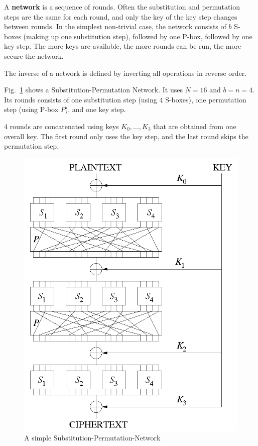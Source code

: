 A \textbf{network} is a sequence of rounds.
Often the substitution and permutation steps are the same for each round, and only the key of the key step changes between rounds.
In the simplest non-trivial case, the network consists of $b$ S-boxes (making up one substitution step), followed by one P-box, followed by one key step.
The more keys are available, the more rounds can be run, the more secure the network.

The inverse of a network is defined by inverting all operations in reverse order.

\begin{example}\label{ex:sd:spn}
Fig.~\ref{fig:sd:subpernet} shows a Substitution-Permutation Network.
It uses $N=16$ and $b=n=4$.
Its rounds consists of one substitution step (using $4$ S-boxes), one permutation step (using P-box $P$), and one key step.

$4$ rounds are concatenated using keys $K_0,\ldots,K_3$ that are obtained from one overall key.
The first round only uses the key step, and the last round skips the permutation step.
\end{example}

\begin{figure}[htb]
\begin{center}
\includegraphics[width=.5\textwidth]{SubstitutionPermutationNetwork.png}
\end{center}
\caption{A simple Substitution-Permutation-Network\protect\footnotemark}\label{fig:sd:subpernet}
\end{figure}

